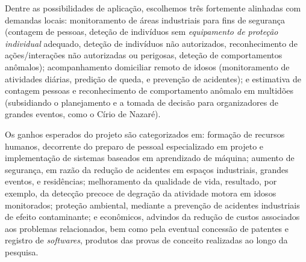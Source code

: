Dentre as possibilidades de aplicação, escolhemos três fortemente alinhadas com demandas locais: monitoramento de áreas industriais para fins de segurança (contagem de pessoas, deteção de indivíduos sem \emph{equipamento de proteção individual} adequado, deteção de indivíduos não autorizados, reconhecimento de ações/interações não autorizadas ou perigosas, deteção de comportamentos anômalos);  acompanhamento domiciliar remoto de idosos (monitoramento de atividades diárias, predição de queda, e prevenção de acidentes); e estimativa de contagem pessoas e reconhecimento de comportamento anômalo em multidões (subsidiando o planejamento e a tomada de decisão para organizadores de grandes eventos, como o Círio de Nazaré).


Os ganhos esperados do projeto são categorizados em: formação de recursos humanos, decorrente do preparo de pessoal especializado em projeto e implementação de sistemas baseados em aprendizado de máquina; aumento de segurança, em razão da redução de acidentes em espaços industriais, grandes eventos, e residências; melhoramento da qualidade de vida, resultado, por exemplo, da detecção precoce de degração da atividade motora em idosos monitorados; proteção ambiental, mediante a prevenção de acidentes industriais de efeito contaminante; e econômicos, advindos da redução de custos associados aos problemas relacionados, bem como pela eventual concessão de patentes e registro de \emph{softwares}, produtos das provas de conceito realizadas ao longo da pesquisa.
  
  










